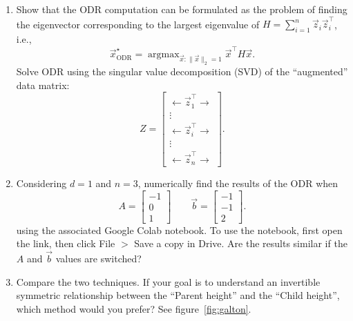\documentclass[10pt]{article}
\DeclareMathOperator*{\argmax}{argmax}
\begin{document}
\begin{enumerate}[label=(\alph*), resume]
\item Show that the ODR computation can be formulated as the problem of finding the eigenvector corresponding to the largest eigenvalue of $H = \sum_{i=1}^{n} \vec{z}_i \vec{z}_i^\top$, i.e.,
\begin{equation}
\vec{x}^\star_{\text{ODR}} = \argmax_{\vec{x}:\|\vec{x}\|_2=1} \vec{x}^\top H \vec{x}.
\end{equation}
Solve ODR using the singular value decomposition (SVD) of the ``augmented'' data matrix:
\begin{equation}
Z = \begin{bmatrix} \leftarrow \vec{z}_1^\top \rightarrow \\ \vdots \\ \leftarrow \vec{z}_i^\top \rightarrow \\ \vdots \\ \leftarrow \vec{z}_n^\top \rightarrow \end{bmatrix}.
\end{equation}

\item Considering $d = 1$ and $n = 3$, numerically find the results of the ODR when
\begin{equation}
A = \begin{bmatrix} -1 \\ 0 \\ 1 \end{bmatrix} \qquad \vec{b} = \begin{bmatrix} -1 \\ -1 \\ 2 \end{bmatrix}.
\end{equation}
using the associated Google Colab notebook. To use the notebook, first open the link, then click File $>$ Save a copy in Drive. Are the results similar if the $A$ and $\vec{b}$ values are switched?

\item Compare the two techniques. If your goal is to understand an invertible symmetric relationship between the ``Parent height'' and the ``Child height'', which method would you prefer? See figure~\ref{fig:galton}.
\end{enumerate}

\bigskip
\end{document}

